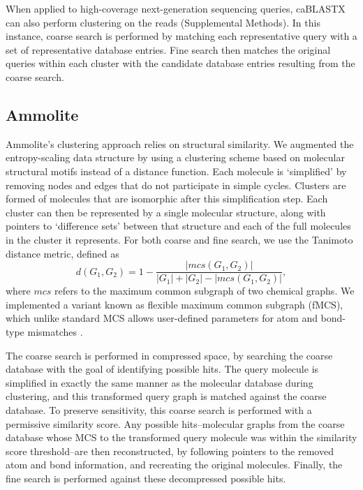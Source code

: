 \documentclass[review,preprint,12pt]{elsarticle}
\renewcommand{\cite}{\citep} %
\theoremstyle{definition}
\theoremstyle{remark}
\numberwithin{equation}{section}
\begin{document}
When applied to high-coverage next-generation sequencing queries, caBLASTX can also perform clustering on the reads (Supplemental Methods).
In this instance, coarse search is performed by matching each representative query with a set of representative database entries.
Fine search then matches the original queries within each cluster with the candidate database entries resulting from the coarse search.

\subsection{Ammolite}
Ammolite's clustering approach relies on structural similarity.
We augmented the entropy-scaling data structure by using a clustering scheme based on molecular structural motifs instead of a distance function.
Each molecule is `simplified' by removing nodes and edges that do not
participate in simple cycles.
Clusters are formed of molecules that are isomorphic after this simplification
step.
Each cluster can then be represented by a single molecular structure, along 
with pointers to `difference sets'  between that structure and each of the 
full molecules in the cluster it represents.
For both coarse and fine search, we use the Tanimoto distance metric, defined as
\[d(G_1,G_2) = 1 - \frac{ |mcs(G_1,G_2)| }{|G_1|+|G_2|-|mcs(G_1,G_2)|},\]
where $mcs$ refers to the maximum common subgraph of two chemical graphs. 
We implemented a variant known as 
flexible maximum common subgraph (fMCS), which unlike standard MCS allows user-defined parameters for atom and bond-type mismatches \cite{cao2008maximum}.

The coarse search is performed in compressed space, by searching 
the coarse database with the goal of identifying possible hits.
The query molecule is simplified in exactly the same manner as 
the molecular database during clustering, and this transformed query graph is 
matched against the coarse database.
To preserve sensitivity, this coarse search is performed with a permissive 
similarity score.
Any possible hits--molecular graphs from the coarse database whose MCS to 
the transformed query molecule was within the similarity score threshold--are 
then reconstructed, by following
pointers to the removed atom and bond information, and recreating the 
original molecules.
Finally, the fine search is performed against these decompressed possible 
hits.
\end{document}
